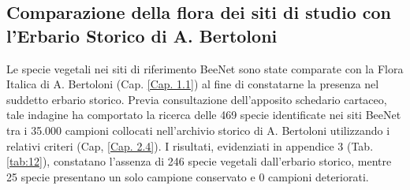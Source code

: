 \documentclass[main.tex]{subfiles}
\begin{document}
\subsection{Comparazione della flora dei siti di studio con l’Erbario Storico di A. Bertoloni}

Le specie vegetali nei siti di riferimento BeeNet sono state comparate con la Flora Italica di A. Bertoloni (Cap. \ref{Cap. 1.1}) al fine di constatarne la presenza nel suddetto erbario storico.
Previa consultazione dell’apposito schedario cartaceo, tale indagine ha comportato la ricerca delle 469 specie identificate nei siti BeeNet tra i 35.000 campioni collocati nell’archivio storico di A. Bertoloni utilizzando i relativi criteri (Cap, \ref{Cap. 2.4}).
I risultati, evidenziati in appendice 3 (Tab. \ref{tab:12}), constatano l’assenza di 246 specie vegetali dall’erbario storico, mentre 25 specie presentano un solo campione conservato e 0 campioni deteriorati.
\end{document}

